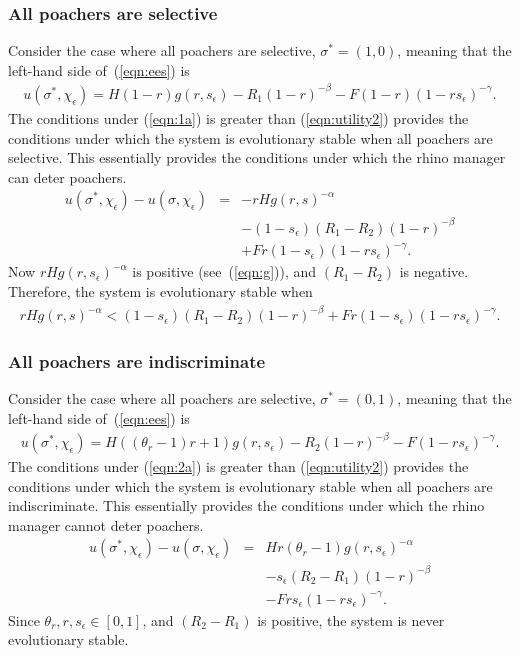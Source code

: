 \documentclass[10pt]{article}
\begin{document}
\subsubsection{All poachers are selective}
Consider the case where all poachers are selective,  $\sigma^* = (1,0)$, meaning that the left-hand side of~(\ref{eqn:ees}) is 
\begin{eqnarray}
\label{eqn:1a}
u(\sigma^*,\chi_\epsilon) = H(1-r)g(r,s_\epsilon)-R_1(1-r)^{-\beta} - F(1-r)(1-rs_\epsilon)^{-\gamma}.
\end{eqnarray}
The conditions under (\ref{eqn:1a}) is greater than (\ref{eqn:utility2}) provides the conditions under which the system is evolutionary stable when all poachers are selective. This essentially provides the conditions under which the rhino manager can deter poachers. 
\begin{eqnarray}
u(\sigma^*,\chi_\epsilon) -u(\sigma,\chi_\epsilon) &=& 
-rHg(r,s)^{-\alpha} 
\\ \nonumber &&- (1-s_\epsilon)(R_1-R_2)(1-r)^{-\beta} 
\\ \nonumber
&&+ Fr (1-s_\epsilon) (1-rs_\epsilon)^{-\gamma}.
\end{eqnarray}
Now $rHg(r,s_\epsilon)^{-\alpha}$ is positive (see~(\ref{eqn:g})), and $(R_1-R_2)$ is negative. Therefore, the system is evolutionary stable when 
\begin{eqnarray}
\label{ees1}
rHg(r,s)^{-\alpha} < (1-s_\epsilon)(R_1-R_2)(1-r)^{-\beta} +Fr (1-s_\epsilon) (1-rs_\epsilon)^{-\gamma}.
\end{eqnarray}

\subsubsection{All poachers are indiscriminate}
Consider the case where all poachers are selective,  $\sigma^* = (0,1)$, meaning that the left-hand side of~(\ref{eqn:ees}) is 
\begin{eqnarray}
\label{eqn:2a}
u(\sigma^*,\chi_\epsilon) = H((\theta_r-1)r+1)g(r,s_\epsilon)-R_2(1-r)^{-\beta} - F(1-rs_\epsilon)^{-\gamma}.
\end{eqnarray}
The conditions under (\ref{eqn:2a}) is greater than (\ref{eqn:utility2}) provides the conditions under which the system is evolutionary stable when all poachers are indiscriminate. This essentially provides the conditions under which the rhino manager cannot deter poachers. 
\begin{eqnarray}
u(\sigma^*,\chi_\epsilon) -u(\sigma,\chi_\epsilon) &=& 
Hr(\theta_r -1)g(r,s_\epsilon)^{-\alpha} 
\\ \nonumber &&- s_\epsilon(R_2-R_1)(1-r)^{-\beta} 
\\ \nonumber
&&- Fr s_\epsilon (1-rs_\epsilon)^{-\gamma}.
\end{eqnarray}
Since $\theta_r, r, s_\epsilon \in [0,1]$, and $(R_2-R_1)$ is positive, the system is never evolutionary stable.
\begin{thebibliography}{00}

\end{thebibliography}
\end{document}
